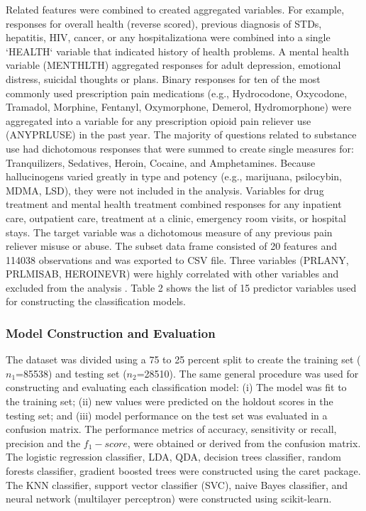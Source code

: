 \documentclass[sigconf]{acmart}
\begin{document}
Related features were combined to created aggregated variables. For example, 
responses for overall health (reverse scored), previous diagnosis of STDs, 
hepatitis, HIV, cancer, or any hospitalizationa were combined into a single 
`HEALTH` variable that indicated history of health problems. A mental health 
variable (MENTHLTH) aggregated responses for adult depression, emotional 
distress, suicidal thoughts or plans. Binary responses for ten of the most 
commonly used prescription pain medications (e.g., Hydrocodone, Oxycodone, 
Tramadol, Morphine, Fentanyl, Oxymorphone, Demerol, Hydromorphone) were
aggregated into a variable for any prescription opioid pain reliever use 
(ANYPRLUSE) in the past year. The majority of questions related to substance 
use had dichotomous responses that were summed to create single measures for: 
Tranquilizers, Sedatives, Heroin, Cocaine, and Amphetamines. Because 
hallucinogens varied greatly in type and potency (e.g., marijuana, psilocybin, 
MDMA, LSD), they were not included in the analysis. Variables for drug 
treatment and mental health treatment combined responses for any inpatient 
care, outpatient care, treatment at a clinic, emergency room visits, or 
hospital stays. The target variable was a dichotomous measure of any previous 
pain reliever misuse or abuse. The subset data frame consisted of 20 features 
and 114038 observations and was exported to CSV file. Three variables (PRLANY, 
PRLMISAB, HEROINEVR) were highly correlated with other variables and excluded 
from the analysis . Table 2 shows the list of 15 predictor variables used for 
constructing the classification models. 



\subsubsection{Model Construction and Evaluation}

The dataset was divided using a 75 to 25 percent split to create the training 
set ($n_1$=85538) and testing set ($n_2$=28510). The same general procedure 
was used for constructing and evaluating each classification model: (i) The 
model was fit to the training set; (ii) new values were predicted on the 
holdout scores in the testing set; and (iii) model performance on the test 
set was evaluated in a confusion matrix. The performance metrics of accuracy, 
sensitivity or recall, precision and the $f_1-score$, were obtained or 
derived from the confusion matrix. The logistic regression classifier, LDA, 
QDA, decision trees classifier, random forests classifier, gradient boosted 
trees were constructed using the caret package. The KNN classifier, support 
vector classifier (SVC), naive Bayes classifier, and neural network 
(multilayer perceptron) were constructed using scikit-learn. 
\end{document}
